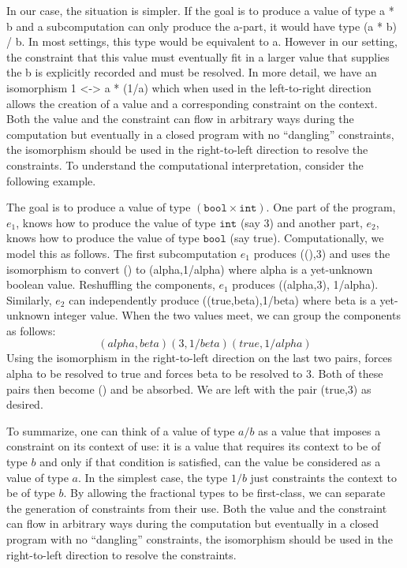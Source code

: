 \documentclass[preprint]{sigplanconf}
\begin{document}
In our case, the situation is simpler. If the goal is to produce a value of
type {{a * b}} and a subcomputation can only produce the {{a}}-part, it would
have type {{(a * b) / b}}. In most settings, this type would be equivalent to
{{a}}. However in our setting, the constraint that this value must eventually
fit in a larger value that supplies the {{b}} is explicitly recorded and must
be resolved. In more detail, we have an isomorphism {{ 1 <-> a * (1/a) }}
which when used in the left-to-right direction allows the creation of a value
and a corresponding constraint on the context.  Both the value and the
constraint can flow in arbitrary ways during the computation but eventually
in a closed program with no ``dangling'' constraints, the isomorphism should
be used in the right-to-left direction to resolve the constraints.  To
understand the computational interpretation, consider the following example.

The goal is to produce a value of type $(\texttt{bool} \times
\texttt{int})$. One part of the program, $e_1$, knows how to produce the
value of type $\texttt{int}$ (say {{3}}) and another part, $e_2$, knows how
to produce the value of type $\texttt{bool}$ (say {{true}}). Computationally,
we model this as follows. The first subcomputation $e_1$ produces {{((),3)}}
and uses the isomorphism to convert {{()}} to {{(alpha,1/alpha)}} where
{{alpha}} is a yet-unknown boolean value. Reshuffling the components, $e_1$
produces {{((alpha,3), 1/alpha)}}. Similarly, $e_2$ can independently produce
{{((true,beta),1/beta)}} where {{beta}} is a yet-unknown integer value.
When the two values meet, we can group the components as follows:
\[
{{(alpha,beta)}}  {{(3,1/beta)}}  {{(true,1/alpha)}}
\]
Using the isomorphism in the right-to-left direction on the last two pairs,
forces {{alpha}} to be resolved to {{true}} and forces {{beta}} to be
resolved to {{3}}. Both of these pairs then become {{()}} and be absorbed. We
are left with the pair {{(true,3)}} as desired. 

To summarize, one can think of a value of type $a/b$ as a value that imposes
a constraint on its context of use: it is a value that requires its context
to be of type $b$ and only if that condition is satisfied, can the value be
considered as a value of type $a$. In the simplest case, the type $1/b$ just
constraints the context to be of type $b$. By allowing the fractional types
to be first-class, we can separate the generation of constraints from their
use. Both the value and the constraint can flow in arbitrary ways during the
computation but eventually in a closed program with no ``dangling''
constraints, the isomorphism should be used in the right-to-left direction to
resolve the constraints.
\end{document}
